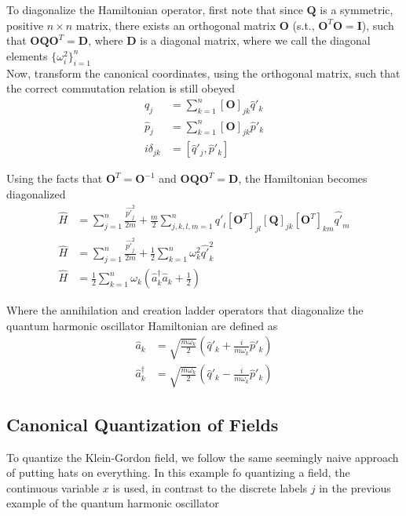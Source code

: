 \noindent To diagonalize the Hamiltonian operator, first note that since $\textbf{Q}$ is a symmetric, positive $n \times n$ matrix, there exists an orthogonal matrix $\textbf{O}$ (s.t., $\textbf{O}^T \textbf{O} = \textbf{I}$), such that $\textbf{O} \textbf{Q} \textbf{O}^T = \textbf{D}$, where $\textbf{D}$ is a diagonal matrix, where we call the diagonal elements $\{ \omega_i^2 \}_{i=1}^n$ \\

\noindent Now, transform the canonical coordinates, using the orthogonal matrix, such that the correct commutation relation is still obeyed
\begin{align}
\hat{q}_j &= \sum_{k=1}^n [\textbf{O}]_{jk} \hat{q}'_k \\
\hat{p}_j &= \sum_{k=1}^n [\textbf{O}]_{jk} \hat{p}'_k \\
i \delta_{jk} &= [ \hat{q}'_j, \hat{p}'_k ]
\end{align}

\noindent Using the facts that $\textbf{O}^T = \textbf{O}^{-1}$ and $\textbf{O} \textbf{Q} \textbf{O}^T = \textbf{D}$, the Hamiltonian becomes diagonalized
\begin{align}
\hat{H} &= \sum_{j=1}^n \frac{\hat{p'}_j^2}{2 m} + \frac{m}{2} \sum_{j, k, l, m=1}^n \hat{q'}_l [\textbf{O}^T]_{jl} [\textbf{Q}]_{jk} [\textbf{O}^T]_{km} \hat{q'}_m \\
\hat{H} &= \sum_{j=1}^n \frac{\hat{p'}_j^2}{2 m} + \frac{1}{2} \sum_{k=1}^n \omega_k^2 \hat{q'}_k^2 \\
\hat{H} &= \frac{1}{2} \sum_{k=1}^n \omega_k (\hat{a}_k^\dagger \hat{a}_k + \frac{1}{2})
\end{align}

\noindent Where the annihilation and creation ladder operators that diagonalize the quantum harmonic oscillator Hamiltonian are defined as
\begin{align}
\hat{a}_k &= \sqrt{\frac{m \omega_k}{2}} (\hat{q}'_k + \frac{i}{m \omega_k} \hat{p}'_k) \\
\hat{a}_k^\dagger &= \sqrt{\frac{m \omega_k}{2}} (\hat{q}'_k - \frac{i}{m \omega_k} \hat{p}'_k)
\end{align}

\subsection*{Canonical Quantization of Fields}

\noindent To quantize the Klein-Gordon field, we follow the same seemingly naive approach of putting hats on everything. In this example fo quantizing a field, the continuous variable $x$ is used, in contrast to the discrete labels $j$ in the previous example of the quantum harmonic oscillator

